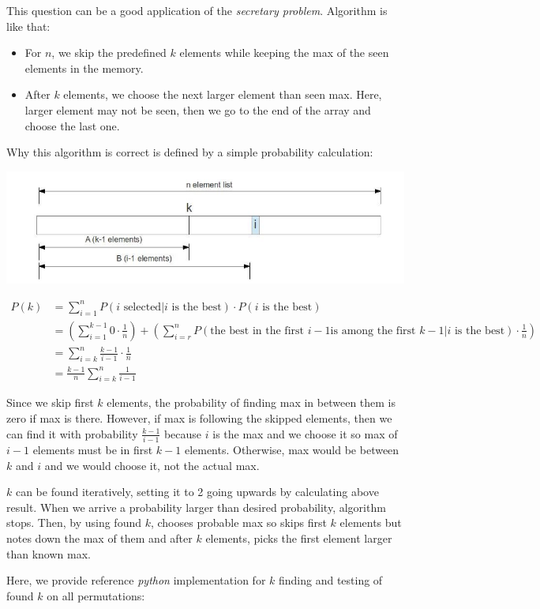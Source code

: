 This question can be a good application of the \textit{secretary problem}. Algorithm is like that:

\begin{itemize}
  \item For $n$, we skip the predefined $k$ elements while keeping the max of the seen elements in the memory.
  \item After $k$ elements, we choose the next larger element than seen max. Here, larger element may not be seen, then we go to the end of the array and choose the last one.
\end{itemize}

Why this algorithm is correct is defined by a simple probability calculation:

\includegraphics[scale=0.5]{q4}

\begin{equation*}
  \begin{split}
  P(k) &= \sum_{i=1}^{n} P(\text{$i$ selected} | \text{$i$ is the best}) \cdot P(\text{$i$ is the best}) \\
       &= (\sum_{i=1}^{k-1} 0 \cdot \frac{1}{n}) + (\sum_{i=r}^{n} P(
         \text{the best in the first $i-1$} 
         \text{is among the first $k-1$} | \text{$i$ is the best}) \cdot \frac{1}{n}) \\
       &= \sum_{i=k}^{n} \frac{k-1}{i-1} \cdot \frac{1}{n} \\
       &= \frac{k-1}{n} \sum_{i=k}^{n} \frac{1}{i-1} 
  \end{split} 
\end{equation*}

  Since we skip first $k$ elements, the probability of finding max in between them is zero if max is there. However, if max is following the skipped elements, then we can find it with probability $\frac{k-1}{i-1}$ because $i$ is the max and we choose it so max of $i-1$ elements must be in first $k-1$ elements. Otherwise, max would be between $k$ and $i$ and we would choose it, not the actual max.
  
  $k$ can be found iteratively, setting it to 2 going upwards by calculating above result. When we arrive a probability larger than desired probability, algorithm stops. Then, by using found $k$, chooses probable max so skips first $k$ elements but notes down the max of them and after $k$ elements, picks the first element larger than known max.
  
  Here, we provide reference \textit{python} implementation for $k$ finding and testing of found $k$ on all permutations:


